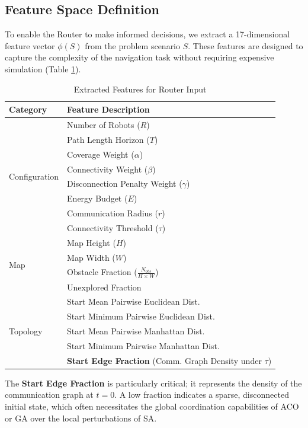 \documentclass[conference]{IEEEtran}
\begin{document}
\subsection{Feature Space Definition}
\label{sec:features}
To enable the Router to make informed decisions, we extract a 17-dimensional feature vector $\phi(S)$ from the problem scenario $S$. These features are designed to capture the complexity of the navigation task without requiring expensive simulation (Table \ref{tab:features}).

\begin{table}[h]
\centering
\caption{Extracted Features for Router Input}
\label{tab:features}
\begin{tabular}{@{}ll@{}}
\toprule
\textbf{Category} & \textbf{Feature Description} \\
\midrule
\multirow{8}{*}{Configuration} & Number of Robots ($R$) \\
& Path Length Horizon ($T$) \\
& Coverage Weight ($\alpha$) \\
& Connectivity Weight ($\beta$) \\
& Disconnection Penalty Weight ($\gamma$) \\
& Energy Budget ($E$) \\
& Communication Radius ($r$) \\
& Connectivity Threshold ($\tau$) \\
\midrule
\multirow{4}{*}{Map} & Map Height ($H$) \\
& Map Width ($W$) \\
& Obstacle Fraction ($\frac{N_{obs}}{H \times W}$) \\
& Unexplored Fraction \\
\midrule
\multirow{5}{*}{Topology} & Start Mean Pairwise Euclidean Dist. \\
& Start Minimum Pairwise Euclidean Dist. \\
& Start Mean Pairwise Manhattan Dist. \\
& Start Minimum Pairwise Manhattan Dist. \\
& \textbf{Start Edge Fraction} (Comm. Graph Density under $\tau$) \\
\bottomrule
\end{tabular}
\end{table}

The \textbf{Start Edge Fraction} is particularly critical; it represents the density of the communication graph at $t=0$. A low fraction indicates a sparse, disconnected initial state, which often necessitates the global coordination capabilities of ACO or GA over the local perturbations of SA.
\end{document}
